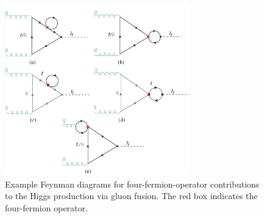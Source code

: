 \begin{figure}[h!]
	\begin{center}
		\includegraphics[width=8cm]{fig/ggF-4F_NLO.pdf}
		\caption{Example Feynman diagrams for four-fermion-operator contributions to the Higgs production via gluon fusion. The red box indicates the four-fermion operator.\label{fig:ggh} }
	\end{center}
		\vspace{-1.5 cm}
\end{figure}
